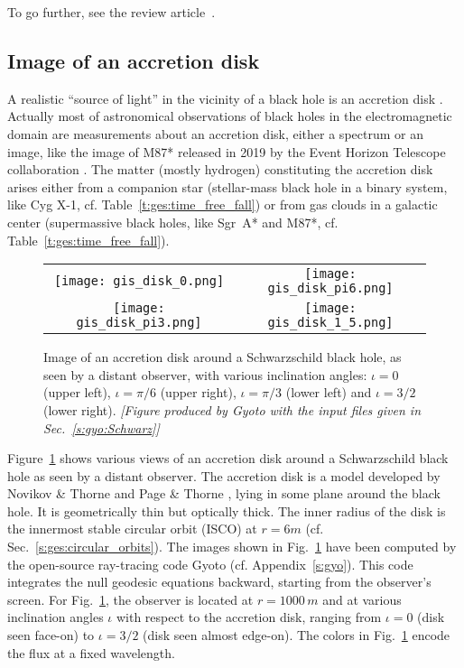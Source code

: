 To go further, see the review article~\cite{CunhaH18}.

\subsection{Image of an accretion disk} \label{s:gis:image_disk}

A realistic ``source of light'' in the vicinity of a black hole is an
accretion disk \cite{AbramF13,King23}. Actually most of astronomical
observations of black holes in the electromagnetic domain are measurements
about an accretion disk, either a spectrum or an image, like the image
of M87* released in 2019 by the Event Horizon Telescope collaboration
\cite{EHT19a}. The matter (mostly hydrogen) constituting the accretion disk
arises either from a companion star (stellar-mass black hole in a binary
system, like Cyg X-1, cf. Table~\ref{t:ges:time_free_fall})
or from gas clouds in a galactic center (supermassive black holes, like
Sgr~A* and M87*, cf. Table~\ref{t:ges:time_free_fall}).

\begin{figure}
\begin{center}
\begin{tabular}{cc}
\texttt{[image: gis\_disk\_0.png]} &
\texttt{[image: gis\_disk\_pi6.png]} \\[1ex]
\texttt{[image: gis\_disk\_pi3.png]} &
\texttt{[image: gis\_disk\_1\_5.png]}
\end{tabular}
\end{center}
\caption[]{\label{f:gis:disk_images} \footnotesize
Image of an accretion disk around a Schwarzschild black hole, as seen
by a distant observer, with various inclination angles:
$\iota=0$ (upper left), $\iota=\pi/6$ (upper right), $\iota=\pi/3$ (lower left)
and $\iota=3/2$ (lower right).
\textsl{[Figure produced by \textsf{Gyoto} with the input
files given in Sec.~\ref{s:gyo:Schwarz}]}
}
\end{figure}

Figure~\ref{f:gis:disk_images} shows various views of an accretion disk
around a Schwarzschild black hole as seen by a distant observer.
The accretion disk is a model
developed by Novikov \& Thorne \cite{NovikT73} and Page \& Thorne \cite{PageT74},
lying in some plane around the black hole.
It is geometrically thin but optically thick.
The inner radius of the disk
is the innermost stable circular orbit (ISCO)
at $r=6m$ (cf. Sec.~\ref{s:ges:circular_orbits}). The images shown in
Fig.~\ref{f:gis:disk_images} have been computed by the open-source ray-tracing code
\textsf{Gyoto} \cite{VincePGP11} (cf. Appendix~\ref{s:gyo}).
This code integrates the null geodesic equations backward, starting from the observer's
screen. For Fig.~\ref{f:gis:disk_images}, the observer is located at $r=1000\, m$
and at various inclination angles $\iota$ with respect to the accretion disk,
ranging from $\iota=0$ (disk seen face-on) to
$\iota=3/2$ (disk seen almost edge-on).
The colors in Fig.~\ref{f:gis:disk_images} encode the flux at a fixed wavelength.

